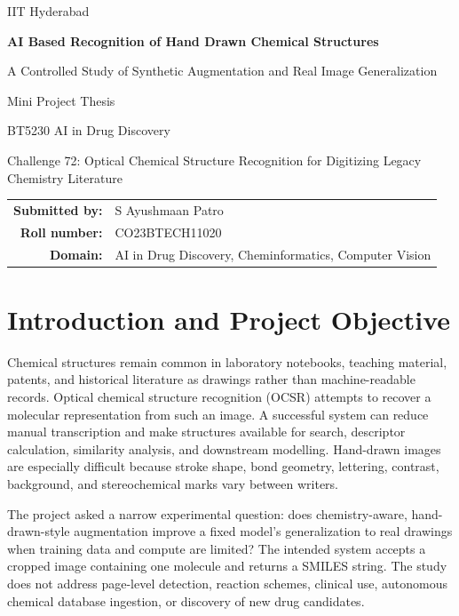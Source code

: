 \documentclass[11pt,a4paper]{article}
\newcommand{\studentname}{S Ayushmaan Patro}
\newcommand{\rollnumber}{CO23BTECH11020}
\newcommand{\institution}{IIT Hyderabad}
\newcommand{\submissiondate}{September 2026}
\begin{document}
\begin{titlepage}
  \centering
  \vspace*{1.2cm}
  {\Large \institution\par}
  \vspace{1.6cm}
  {\Huge\bfseries AI Based Recognition of Hand Drawn Chemical Structures\par}
  \vspace{0.6cm}
  {\Large A Controlled Study of Synthetic Augmentation and Real Image Generalization\par}
  \vspace{1.5cm}
  {\large Mini Project Thesis\par}
  \vspace{0.2cm}
  {\large BT5230 AI in Drug Discovery\par}
  \vspace{0.2cm}
  {\large Challenge 72: Optical Chemical Structure Recognition for Digitizing Legacy Chemistry Literature\par}
  \vspace{1.4cm}
  \begin{tabular}{rl}
    \textbf{Submitted by:} & \studentname \\
    \textbf{Roll number:} & \rollnumber \\
    \textbf{Domain:} & AI in Drug Discovery, Cheminformatics, Computer Vision
  \end{tabular}
  \vfill
\end{titlepage}


\section*{Introduction and Project Objective}

Chemical structures remain common in laboratory notebooks, teaching material, patents, and
historical literature as drawings rather than machine-readable records. Optical chemical
structure recognition (OCSR) attempts to recover a molecular representation from such an
image. A successful system can reduce manual transcription and make structures available for
search, descriptor calculation, similarity analysis, and downstream modelling. Hand-drawn
images are especially difficult because stroke shape, bond geometry, lettering, contrast,
background, and stereochemical marks vary between writers.

The project asked a narrow experimental question: does chemistry-aware, hand-drawn-style
augmentation improve a fixed model's generalization to real drawings when training data and
compute are limited? The intended system accepts a cropped image containing one molecule and
returns a SMILES string. The study does not address page-level detection, reaction schemes,
clinical use, autonomous chemical database ingestion, or discovery of new drug candidates.
\end{document}
